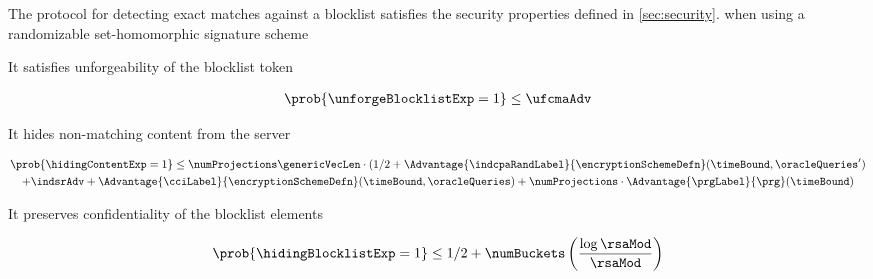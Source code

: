 \begin{theorem}
	
	The protocol \protocolFM for detecting exact matches against a blocklist satisfies the security properties defined in \ref{sec:security}.
when using a randomizable set-homomorphic signature scheme \ourSigSchemeDefn 
	

	\enumListStart
	
	\item It satisfies unforgeability of the blocklist token 
	\begin{small}
	\begin{gather*}
    \prob{\unforgeBlocklistExp = 1} \le \ufcmaAdv
\end{gather*}
	\end{small}
	
	\item It hides non-matching content from the server 
	
	\begin{small}
					\begin{gather*}
			\prob{\hidingContentExp = 1} \le \numProjections \genericVecLen \cdot (1/2 + \Advantage{\indcpaRandLabel}{\encryptionSchemeDefn}(\timeBound, 
		\oracleQueries') \\  + \indsrAdv +  \Advantage{\cciLabel}{\encryptionSchemeDefn}(\timeBound, \oracleQueries)  + \numProjections \cdot \Advantage{\prgLabel}{\prg}(\timeBound)
		\end{gather*}
		\end{small}
	
	\item It preserves confidentiality of the blocklist elements
	
	\begin{small}
				\begin{gather*}
				\prob{\hidingBlocklistExp = 1} \le 1/2 + \numBuckets \left(\frac{\log \rsaMod}{\rsaMod}\right)
			\end{gather*}
		\end{small}
	
	\enumListEnd  
\end{theorem}

